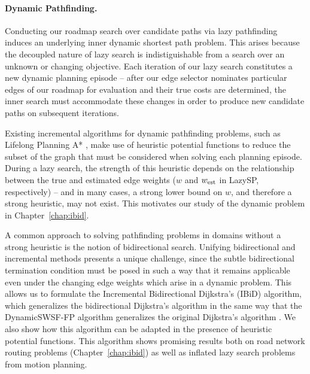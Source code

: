 \paragraph{Dynamic Pathfinding.}
Conducting our roadmap search over candidate paths via lazy
pathfinding
induces an underlying inner dynamic shortest path problem.
This arises because the decoupled nature of lazy search
is indistiguishable from a search over an unknown or changing objective.
Each iteration of our lazy search constitutes a new dynamic planning
episode --
after our edge selector nominates particular edges of our roadmap
for evaluation and their true costs are determined,
the inner search must accommodate these changes in order to produce
new candidate paths on subsequent iterations.

Existing incremental algorithms for dynamic pathfinding problems,
such as Lifelong Planning A* \citep{koenig2004lpastar},
make use of heuristic potential functions to reduce the subset of
the graph that must be considered when solving each planning episode.
During a lazy search,
the strength of this heuristic depends on
the relationship between the true and estimated edge weights
($w$ and $w_{\mbox{\scriptsize est}}$ in LazySP, respectively)
-- and in many cases, a strong lower bound on $w$,
and therefore a strong heuristic, may not exist.
This motivates our study of the dynamic problem
in Chapter~\ref{chap:ibid}.

A common approach to solving pathfinding problems in domains without
a strong heuristic is the notion of bidirectional search.
Unifying bidirectional and incremental methods presents a unique
challenge,
since the subtle bidirectional termination condition must be
posed in such a way that it remains applicable even under the
changing edge weights which arise in a dynamic problem.
This allows us to formulate the Incremental Bidirectional Dijkstra's
(IBiD) algorithm,
which generalizes the bidirectional Dijkstra's algorithm
\citep{goldberg2005spexternalmemory}
in the same way that the DynamicSWSF-FP algorithm
\citep{ramalingam1996dynamicswsffp} generalizes the original
Dijkstra's algorithm \citep{dijkstra1959anote}.
We also show how this algorithm can be adapted in the presence of
heuristic potential functions.
This algorithm shows promising results both on road network routing
problems (Chapter~\ref{chap:ibid})
as well as inflated lazy search problems from motion planning.

